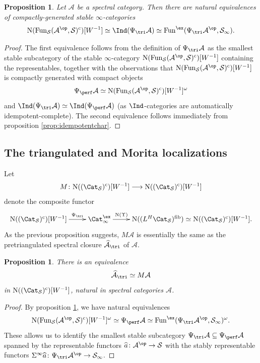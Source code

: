 \documentclass{amsart}
\newcommand{\htp}{\simeq}
\renewcommand{\to}{\mathchoice{\longrightarrow}{\rightarrow}{\rightarrow}{\rightarrow}}
\newcommand{\cA}{{\mathcal A}}
\newcommand{\cS}{{\mathcal S}}
\let\catsymbfont\mathcal
\newcommand{\aA}{{\catsymbfont{A}}}
\newcommand{\aS}{{\catsymbfont{S}}}
\newcommand{\N}{\mathrm{N}}
\newcommand{\stabcat}{\Cat_\i^{\ex}}
\newcommand{\Fun}{\mathrm{Fun}} %
\newcommand{\ispec}{\aS_{\infty}}
\newcommand{\Spcat}{\Cat_\mathcal{S}}%
\renewcommand{\i}{\infty}
\newcommand{\spect}{\Upsilon}
\numberwithin{equation}{section}
\newtheorem{proposition}[equation]{Proposition}
\theoremstyle{definition}
\begin{document}
\begin{proposition}\label{prop:ex/spec}
Let $\cA$ be a spectral category.
Then there are natural equivalences of compactly-generated stable $\i$-categories
\[
\N(\Fun_\cS(\cA^{\op},\cS)^\mathrm{c})[W^{-1}]\simeq\Ind(\Psi_{\tri}\cA)\simeq\Fun^{\ex}(\Psi_{\tri}\cA^{\op},\ispec).
\]
\end{proposition}

\begin{proof}
The first equivalence follows from the definition of $\Psi_{\tri}\aA$ as the smallest stable subcategory of the stable $\i$-category $\N(\Fun_\cS(\cA^{\op},\cS)^\mathrm{c})[W^{-1}]$ containing the representables, together with the observations that $\N(\Fun_\cS(\cA^{\op},\cS)^\mathrm{c})[W^{-1}]$ is compactly generated with compact objects
\[
\Psi_{\perf}\cA\simeq\N(\Fun_\cS(\cA^{\op},\cS)^\mathrm{c})[W^{-1}]^\omega
\]
and $\Ind(\Psi_{\tri}\cA)\simeq\Ind(\Psi_{\perf}\cA)$ (as $\Ind$-categories are automatically idempotent-complete).
The second equivalence follows immediately from proposition \ref{prop:idempotentchar}.
\end{proof}

\subsection{The triangulated and Morita localizations}
Let
\[
M\colon \N((\Spcat)^\mathrm{c})[W^{-1}] \to \N((\Spcat)^\mathrm{c})[W^{-1}]
\]
denote the composite functor 
\begin{equation}\label{eq:mcomp}
\xymatrix{
\N((\Spcat)^\mathrm{c})[W^{-1}] \ar[r]^-{\Psi_{\tri}}
& \stabcat \ar[r]^-{\N(\spect)}
& \N((L^H \Spcat)^{\textrm{fib}}) \htp \N((\Spcat)^\mathrm{c})[W^{-1}].\\ 
}
\end{equation}
As the previous proposition suggests, $M\cA$ is essentially the same as the pretriangulated spectral closure $\widehat{\aA}_{\tri}$ of $\cA$.

\begin{proposition}\label{prop:spec=tri}
There is an equivalence
\[
\widehat{\cA}_{\tri}\simeq M\cA
\]
in $\N((\Spcat)^\mathrm{c})[W^{-1}]$, natural in spectral categories $\cA$.
\end{proposition}

\begin{proof}
By proposition \ref{prop:ex/spec}, we have natural equivalences
\[
\N(\Fun_\cS(\cA^{\op},\cS)^\mathrm{c})[W^{-1}]^\omega\simeq\Psi_{\perf}\cA\simeq\Fun^{\ex}(\Psi_{\tri}\cA^{\op},\ispec)^\omega.
\]
These allows us to identify the smallest stable subcategory $\Psi_{\tri}\cA\subseteq\Psi_{\perf}\cA$ spanned by the representable functors $\widehat{a}\colon\cA^{\op}\to\cS$ with the stably representable functors $\Sigma^\i\widehat{a}\colon\Psi_{\tri}\aA^{\op}\to\ispec$.
\end{proof}
\end{document}
